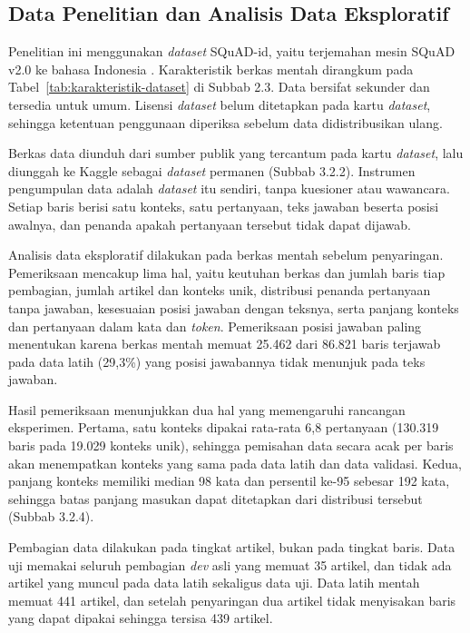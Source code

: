 \subsection{Data Penelitian dan Analisis Data Eksploratif}

Penelitian ini menggunakan \textit{dataset} SQuAD-id, yaitu terjemahan mesin SQuAD v2.0 ke bahasa Indonesia \parencite{muis2020sequence}. Karakteristik berkas mentah dirangkum pada Tabel~\ref{tab:karakteristik-dataset} di Subbab 2.3. Data bersifat sekunder dan tersedia untuk umum. Lisensi \textit{dataset} belum ditetapkan pada kartu \textit{dataset}, sehingga ketentuan penggunaan diperiksa sebelum data didistribusikan ulang.

Berkas data diunduh dari sumber publik yang tercantum pada kartu \textit{dataset}, lalu diunggah ke Kaggle sebagai \textit{dataset} permanen (Subbab 3.2.2). Instrumen pengumpulan data adalah \textit{dataset} itu sendiri, tanpa kuesioner atau wawancara. Setiap baris berisi satu konteks, satu pertanyaan, teks jawaban beserta posisi awalnya, dan penanda apakah pertanyaan tersebut tidak dapat dijawab.

Analisis data eksploratif dilakukan pada berkas mentah sebelum penyaringan. Pemeriksaan mencakup lima hal, yaitu keutuhan berkas dan jumlah baris tiap pembagian, jumlah artikel dan konteks unik, distribusi penanda pertanyaan tanpa jawaban, kesesuaian posisi jawaban dengan teksnya, serta panjang konteks dan pertanyaan dalam kata dan \textit{token}. Pemeriksaan posisi jawaban paling menentukan karena berkas mentah memuat 25.462 dari 86.821 baris terjawab pada data latih (29,3\%) yang posisi jawabannya tidak menunjuk pada teks jawaban.

Hasil pemeriksaan menunjukkan dua hal yang memengaruhi rancangan eksperimen. Pertama, satu konteks dipakai rata-rata 6,8 pertanyaan (130.319 baris pada 19.029 konteks unik), sehingga pemisahan data secara acak per baris akan menempatkan konteks yang sama pada data latih dan data validasi. Kedua, panjang konteks memiliki median 98 kata dan persentil ke-95 sebesar 192 kata, sehingga batas panjang masukan dapat ditetapkan dari distribusi tersebut (Subbab 3.2.4).

Pembagian data dilakukan pada tingkat artikel, bukan pada tingkat baris. Data uji memakai seluruh pembagian \textit{dev} asli yang memuat 35 artikel, dan tidak ada artikel yang muncul pada data latih sekaligus data uji. Data latih mentah memuat 441 artikel, dan setelah penyaringan dua artikel tidak menyisakan baris yang dapat dipakai sehingga tersisa 439 artikel.


